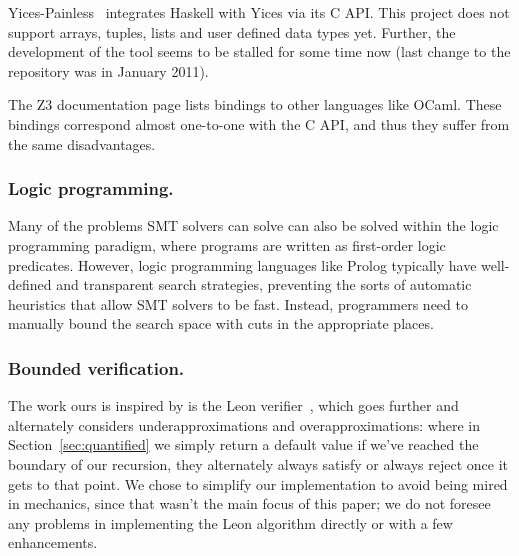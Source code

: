 Yices-Painless~\cite{yices-painless} integrates Haskell with Yices via its C
API. This project does not support arrays, tuples, lists and user defined data
types yet. Further, the development of the tool seems to be stalled for some
time now (last change to the repository was in January 2011).

The Z3 documentation page lists bindings to other languages like OCaml. These
bindings correspond almost one-to-one with the C API, and thus they suffer
from the same disadvantages.

\subsubsection{Logic programming.}

Many of the problems SMT solvers can solve can also be solved within the logic
programming paradigm, where programs are written as first-order logic
predicates. However, logic programming languages like Prolog typically have
well-defined and transparent search strategies, preventing the sorts of
automatic heuristics that allow SMT solvers to be fast. Instead, programmers
need to manually bound the search space with cuts in the appropriate places.

\subsubsection{Bounded verification.}

The work ours is inspired by is the Leon verifier~\cite{sat-recursive},
which goes further and alternately considers underapproximations and
overapproximations: where in Section~\ref{sec:quantified} we simply return a
default value if we've reached the boundary of our recursion, they alternately
always satisfy or always reject once it gets to that point. We chose to
simplify our implementation to avoid being mired in mechanics, since that
wasn't the main focus of this paper; we do not foresee any problems in
implementing the Leon algorithm directly or with a few enhancements.
